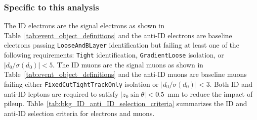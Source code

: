 
\subsubsection{Specific to this analysis}
\label{subsubsec:bkg_fake_specific}
The ID electrons are the signal electrons as shown in Table~\ref{tab:event_object_definitions} and the anti-ID electrons are baseline electrons passing \texttt{LooseAndBLayer} identification but failing at least one of the following requirements: \texttt{Tight} identification, \texttt{GradientLoose} isolation, or $|d_{0}/\sigma(d_{0})| < 5$.
The ID muons are the signal muons as shown in Table~\ref{tab:event_object_definitions} and the anti-ID muons are baseline muons failing either \texttt{FixedCutTightTrackOnly} isolation or $|d_{0}/\sigma(d_{0})| < 3$.
Both ID and anti-ID leptons are required to satisfy $|z_{0} \sin \theta| < 0.5$~mm to reduce the impact of pileup.
Table~\ref{tab:bkg_ID_anti_ID_selection_criteria} summarizes the ID and anti-ID selection criteria for electrons and muons.

\begin{table}[htbp]
    \caption{The ID and anti-ID selection criteria for electrons and muons.}
    \label{tab:bkg_ID_anti_ID_selection_criteria}
\end{table}

